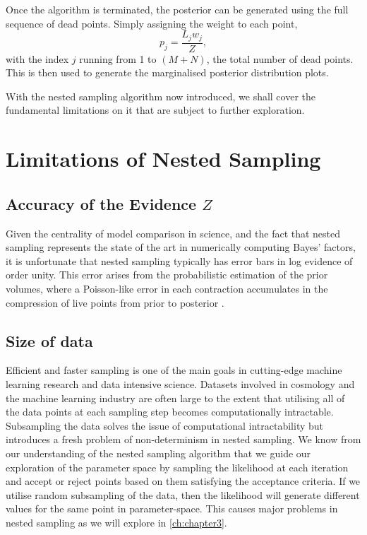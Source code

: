 Once the algorithm is terminated, the posterior can be generated using the full sequence of dead points. Simply assigning the weight to each point,
%
\begin{equation}
    p_j= \frac{L_j w_j}{Z},
\end{equation}
%
with the index $j$ running from 1 to $(M+N)$, the total number of dead points. This is then used to generate the marginalised posterior distribution plots.


With the nested sampling algorithm now introduced, we shall cover the fundamental limitations on it that are subject to further exploration. 


\section{Limitations of Nested Sampling}\label{sec:limitations}

\subsection{Accuracy of the Evidence $Z$}\label{sec:evidence_accuracy}

Given the centrality of model comparison in science, and the fact that nested sampling represents the state of the art in numerically computing Bayes' factors, it is unfortunate that nested sampling typically has error bars in log evidence of order unity. This error arises from the probabilistic estimation of the prior volumes, where a Poisson-like error in each contraction accumulates in the compression of live points from prior to posterior . 



\subsection{Size of data}\label{sec:size_of_data}

Efficient and faster sampling is one of the main goals in cutting-edge machine learning research and data intensive science. Datasets involved in cosmology and the machine learning industry are often large to the extent that utilising all of the data points at each sampling step becomes computationally intractable. Subsampling the data solves the issue of computational intractability but introduces a fresh problem of non-determinism in nested sampling. We know from our understanding of the nested sampling algorithm that we guide our exploration of the parameter space by sampling the likelihood at each iteration and accept or reject points based on them satisfying the acceptance criteria. If we utilise random subsampling of the data, then the likelihood will generate different values for the same point in parameter-space. This causes major problems in nested sampling as we will explore in \cref{ch:chapter3}.



